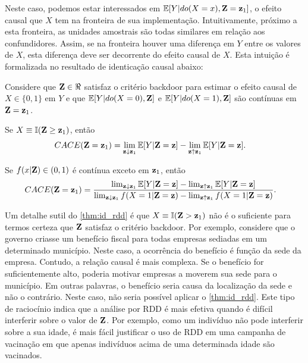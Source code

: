 Neste caso, podemos estar interessados em
${\mathbb E}[Y|do(X=x),{\mathbf{Z}}={\mathbf{z}}_1]$, 
o efeito causal que $X$ tem na 
fronteira de sua implementação.
Intuitivamente, próximo a esta fronteira,
as unidades amostrais são todas similares 
em relação aos confundidores.
Assim, se na fronteira houver uma diferença em $Y$ entre
os valores de $X$, esta diferença 
deve ser decorrente do efeito causal de $X$.
Esta intuição é formalizada no resultado de
identicação causal abaixo:

\begin{theorem}
 \label{thm:id_rdd}
 Considere que ${\mathbf{Z}} \in \Re$ satisfaz o critério backdoor para
 estimar o efeito causal de $X \in \{0,1\}$ em $Y$ e que
 ${\mathbb E}[Y|do(X=0),{\mathbf{Z}}]$ e ${\mathbb E}[Y|do(X=1),{\mathbf{Z}}]$ são 
 contínuas em ${\mathbf{Z}}={\mathbf{z}}_1$.
 
 Se $X \equiv {\mathbb I}({\mathbf{Z}} \geq {\mathbf{z}}_1)$, então
 \begin{align*}
  {CACE}({\mathbf{Z}}={\mathbf{z}}_1)
  &= \lim_{{\mathbf{z}} \downarrow {\mathbf{z}}_1} {\mathbb E}[Y|{\mathbf{Z}} = {\mathbf{z}}] 
  - \lim_{{\mathbf{z}} \uparrow {\mathbf{z}}_1} {\mathbb E}[Y|{\mathbf{Z}} = {\mathbf{z}}].
 \end{align*}
 
 Se $f(x|{\mathbf{Z}}) \in (0,1)$ é contínua exceto em ${\mathbf{z}}_1$, então
 \begin{align*}
  {CACE}({\mathbf{Z}}={\mathbf{z}}_1)
  &= \frac{\lim_{{\mathbf{z}} \downarrow {\mathbf{z}}_1} {\mathbb E}[Y|{\mathbf{Z}} = {\mathbf{z}}] 
  - \lim_{{\mathbf{z}} \uparrow {\mathbf{z}}_1} {\mathbb E}[Y|{\mathbf{Z}} = {\mathbf{z}}]}
  {\lim_{{\mathbf{z}} \downarrow {\mathbf{z}}_1} f(X=1|{\mathbf{Z}}={\mathbf{z}}) 
  - \lim_{{\mathbf{z}} \uparrow {\mathbf{z}}_1} f(X=1|{\mathbf{Z}}={\mathbf{z}})}.
 \end{align*}
\end{theorem}

Um detalhe sutil do \cref{thm:id_rdd} é que
$X \equiv {\mathbb I}({\mathbf{Z}} > {\mathbf{z}}_1)$ não é
o suficiente para termos certeza que
${\mathbf{Z}}$ satisfaz o critério backdoor.
Por exemplo, considere que 
o governo criasse um benefício fiscal para
todas empresas sediadas em um determinado município.
Neste caso, a ocorrência do benefício é
função da sede da empresa. 
Contudo, a relação causal é mais complexa.
Se o benefício for suficientemente alto,
poderia motivar empresas a 
moverem sua sede para o município.
Em outras palavras, 
o benefício seria causa da localização da sede e não o contrário.
Neste caso, não seria possível aplicar o \cref{thm:id_rdd}.
Este tipo de raciocínio indica que a análise por RDD é
mais efetiva quando é difícil interferir sobre o valor de ${\mathbf{Z}}$.
Por exemplo, como um indivíduo não pode interferir sobre a sua idade,
é mais fácil justificar o uso de RDD em
uma campanha de vacinação em que
apenas indivíduos acima de uma determinada idade são vacinados.

